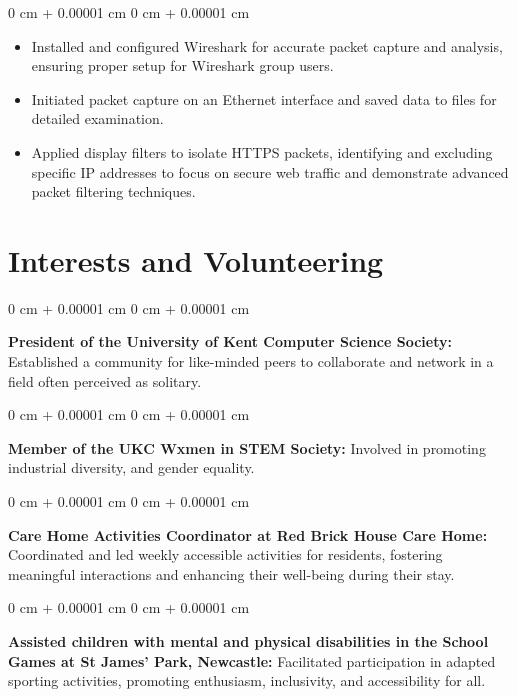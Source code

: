 \documentclass[10pt, letterpaper]{article}
\newenvironment{highlights}{
    \begin{itemize}[
        topsep=0.10 cm,
        parsep=0.10 cm,
        partopsep=0pt,
        itemsep=0pt,
        leftmargin=0 cm + 10pt
    ]
}{
    \end{itemize}
} %
\newenvironment{onecolentry}{
    \begin{adjustwidth}{
        0 cm + 0.00001 cm
    }{
        0 cm + 0.00001 cm
    }
}{
    \end{adjustwidth}
} %
\begin{document}
        \vspace{0.05 cm}
        \begin{onecolentry}
            \begin{highlights}
                \item Installed and configured Wireshark for accurate packet capture and analysis, ensuring proper setup for Wireshark group users.
                \item Initiated packet capture on an Ethernet interface and saved data to files for detailed examination.
                \item Applied display filters to isolate HTTPS packets, identifying and excluding specific IP addresses to focus on secure web traffic and demonstrate advanced packet filtering techniques.
            \end{highlights}
        \end{onecolentry}
   

 \section{Interests and Volunteering}
        
        \begin{onecolentry}
            \textbf{President of the University of Kent Computer Science Society:} Established a community for like-minded peers to collaborate and network in a field often perceived as solitary.
        \end{onecolentry}

        \vspace{0.05 cm}
        \begin{onecolentry}
            \textbf{Member of the UKC Wxmen in STEM Society:} Involved in promoting industrial diversity, and gender equality.
        \end{onecolentry}

        \vspace{0.05 cm}

        \begin{onecolentry}
            \textbf{Care Home Activities Coordinator at Red Brick House Care Home:} Coordinated and led weekly accessible activities for residents, fostering meaningful interactions and enhancing their well-being during their stay. 
        \end{onecolentry}
         \vspace{0.05 cm}

        \begin{onecolentry}
            \textbf{Assisted children with mental and physical disabilities in the School Games at St James’ Park, Newcastle:} Facilitated participation in adapted sporting activities, promoting enthusiasm, inclusivity, and accessibility for all. 
        \end{onecolentry}
          \vspace{0.05 cm}
\end{document}
